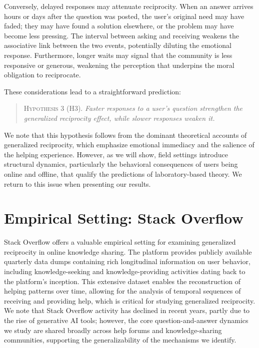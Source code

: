 Conversely, delayed responses may attenuate reciprocity. When an answer arrives hours or days after the question was posted, the user's original need may have faded; they may have found a solution elsewhere, or the problem may have become less pressing. The interval between asking and receiving weakens the associative link between the two events, potentially diluting the emotional response. Furthermore, longer waits may signal that the community is less responsive or generous, weakening the perception that underpins the moral obligation to reciprocate.

These considerations lead to a straightforward prediction:

\begin{quote}
\textsc{Hypothesis 3 (H3).} \emph{Faster responses to a user's question strengthen the generalized reciprocity effect, while slower responses weaken it.}
\end{quote}

We note that this hypothesis follows from the dominant theoretical accounts of generalized reciprocity, which emphasize emotional immediacy and the salience of the helping experience. However, as we will show, field settings introduce structural dynamics, particularly the behavioral consequences of users being online and offline, that qualify the predictions of laboratory-based theory. We return to this issue when presenting our results.

\section{Empirical Setting: Stack Overflow}
\label{sec:empirical_setting}

Stack Overflow offers a valuable empirical setting for examining generalized reciprocity in online knowledge sharing. The platform provides publicly available quarterly data dumps containing rich longitudinal information on user behavior, including knowledge-seeking and knowledge-providing activities dating back to the platform's inception. This extensive dataset enables the reconstruction of helping patterns over time, allowing for the analysis of temporal sequences of receiving and providing help, which is critical for studying generalized reciprocity. We note that Stack Overflow activity has declined in recent years, partly due to the rise of generative AI tools; however, the core question-and-answer dynamics we study are shared broadly across help forums and knowledge-sharing communities, supporting the generalizability of the mechanisms we identify.

